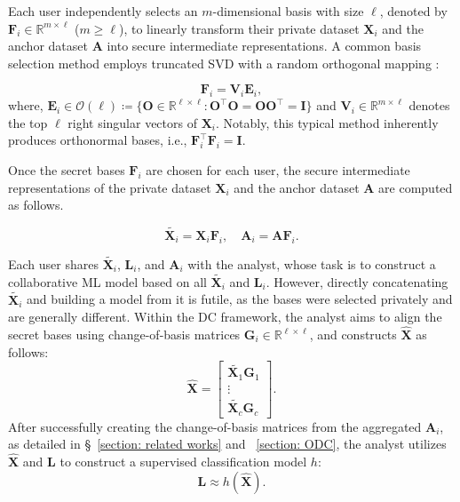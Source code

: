 \documentclass[final,3p,times]{elsarticle}
\theoremstyle{plain}
\newcommand{\matr}[1]{\bm{#1}}        %
\begin{document}
Each user independently selects an \(m\)-dimensional basis with size \(\ell\), denoted by \(\matr{F}_i \in \mathbb{R}^{m \times \ell}\) (\(m \geq \ell\)), to linearly transform their private dataset \(\matr{X}_i\) and the anchor dataset \(\matr{A}\) into secure intermediate representations. A common basis selection method employs truncated SVD with a random orthogonal mapping \cite{FedDCL, DCnoniid}:

\begin{equation}
\label{eq:typicalbasisselection}
    \matr{F}_i = \matr{V}_i \matr{E}_i,
\end{equation}
where, \(\matr{E}_i \in \mathcal{O}(\ell) \coloneqq \{\matr{O} \in \mathbb{R}^{\ell \times \ell} : \matr{O}^\top \matr{O} = \matr{O}\matr{O}^\top = \matr{I}\}\) and \(\matr{V}_i \in \mathbb{R}^{m \times \ell}\) denotes the top \( \ell \) right singular vectors of \( \matr{X}_i \). Notably, this typical method inherently produces orthonormal bases, i.e., \( \matr{F}_i^\top \matr{F}_i = \matr{I} \).

Once the secret bases \(\matr{F}_i\) are chosen for each user, the secure intermediate representations of the private dataset \(\matr{X}_i\) and the anchor dataset \( \matr{A} \)  are computed as follows.

\begin{equation}
\label{eq: IR naive}
    \tilde{\matr{X}_i} = \matr{X}_i\matr{F}_i, \quad \matr{A}_i = \matr{A} \matr{F}_i.
\end{equation}

Each user shares \(\tilde{\matr{X}_i}\), \(\matr{L}_i\), and \(\matr{A}_{i}\) with the analyst, whose task is to construct a collaborative ML model based on all \(\tilde{\matr{X}_i}\) and \(\matr{L}_i\). However, directly concatenating \(\tilde{\matr{X}_i}\) and building a model from it is futile, as the bases were selected privately and are generally different. Within the DC framework, the analyst aims to align the secret bases using change-of-basis matrices \(\matr{G}_i \in \mathbb{R}^{\ell \times \ell}\), and constructs \(\hat{\matr{X}}\) as follows:
\begin{equation}
\label{eq: xhat}
\hat{\matr{X}} = 
\begin{bmatrix}
    \tilde{\matr{X}_1} \matr{G}_1 \\
    \vdots \\
    \tilde{\matr{X}_c} \matr{G}_c
\end{bmatrix}.
\end{equation}
After successfully creating the change-of-basis matrices from the aggregated \(\matr{A}_i\), as detailed in \S~\ref{section: related works} and ~\ref{section: ODC}, the analyst utilizes \( \hat{\matr{X}} \) and \( \matr{L} \) to construct a supervised classification model \( h \):
\begin{equation}
\label{eq: Lapprox}
\matr{L} \approx h(\hat{\matr{X}}).
\end{equation}
\end{document}
